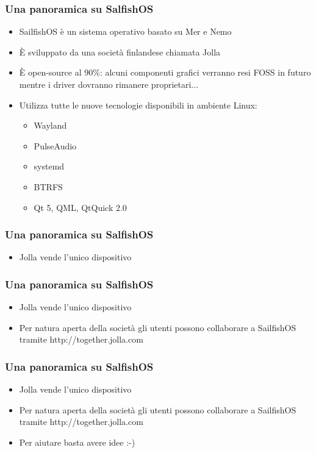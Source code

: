 \documentclass[12pt]{beamer}
\begin{document}
\begin{frame}
\frametitle{Una panoramica su SalfishOS}
\begin{itemize}
\item SailfishOS è un sistema operativo basato su Mer e Nemo
\item È sviluppato da una società finlandese chiamata Jolla
\item È open-source al 90\%: alcuni componenti grafici verranno resi FOSS in futuro mentre i driver dovranno rimanere proprietari...
\item Utilizza tutte le nuove tecnologie disponibili in ambiente Linux:
\begin{itemize}
\item Wayland
\item PulseAudio
\item systemd
\item BTRFS
\item Qt 5, QML, QtQuick 2.0
\end{itemize}
\end{itemize}
\end{frame}


\begin{frame}
	\frametitle{Una panoramica su SalfishOS}
	\begin{itemize}
		\item Jolla vende l'unico dispositivo
	\end{itemize}
\end{frame}

\begin{frame}
	\frametitle{Una panoramica su SalfishOS}
	\begin{itemize}
		\item Jolla vende l'unico dispositivo
		\item Per natura aperta della società gli utenti possono collaborare a SailfishOS tramite http://together.jolla.com
	\end{itemize}
\end{frame}

\begin{frame}
	\frametitle{Una panoramica su SalfishOS}
	\begin{itemize}
		\item Jolla vende l'unico dispositivo
		\item Per natura aperta della società gli utenti possono collaborare a SailfishOS tramite http://together.jolla.com
		\item Per aiutare basta avere idee :-)
	\end{itemize}
\end{frame}
\end{document}
